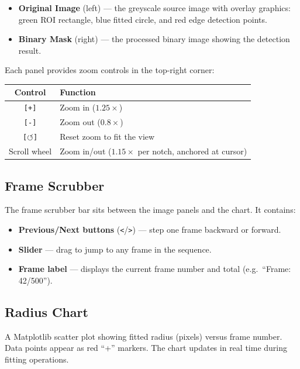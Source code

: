 \documentclass[11pt, letterpaper]{article}
\begin{document}
\begin{itemize}
    \item \textbf{Original Image} (left) --- the greyscale source image with
          overlay graphics: green ROI rectangle, blue fitted circle, and red
          edge detection points.
    \item \textbf{Binary Mask} (right) --- the processed binary image showing
          the detection result.
\end{itemize}

Each panel provides zoom controls in the top-right corner:

\begin{center}
\begin{tabular}{cl}
    \toprule
    \textbf{Control} & \textbf{Function} \\
    \midrule
    \texttt{[+]}  & Zoom in ($1.25\times$) \\
    \texttt{[-]}  & Zoom out ($0.8\times$) \\
    \texttt{[$\circlearrowleft$]} & Reset zoom to fit the view \\
    Scroll wheel  & Zoom in/out ($1.15\times$ per notch, anchored at cursor) \\
    \bottomrule
\end{tabular}
\end{center}

\subsection{Frame Scrubber}

The frame scrubber bar sits between the image panels and the chart. It
contains:

\begin{itemize}
    \item \textbf{Previous/Next buttons} (\texttt{<}/\texttt{>}) --- step one
          frame backward or forward.
    \item \textbf{Slider} --- drag to jump to any frame in the sequence.
    \item \textbf{Frame label} --- displays the current frame number and total
          (e.g.\ ``Frame: 42/500'').
\end{itemize}

\subsection{Radius Chart}

A Matplotlib scatter plot showing fitted radius (pixels) versus frame number.
Data points appear as red ``+'' markers. The chart updates in real time during
fitting operations.
\end{document}
